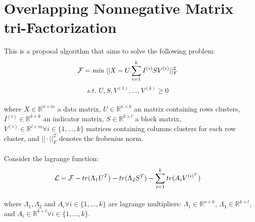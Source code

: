 \documentclass[paper=a4, fontsize=11pt]{scrartcl} %
\numberwithin{equation}{section} %
\numberwithin{figure}{section} %
\numberwithin{table}{section} %
\begin{document}

\section{Overlapping Nonnegative Matrix tri-Factorization}

This is a proposal algorithm that aims to solve the following problem:
$${\cal F} = \textit{min } ||X - U\sum_{i=1}^{k}I^{(i)}SV^{(i)}||^{2}_{F}$$
$$\textit{s.t. } U, S, V^{(1)}, \dots, V^{(k)} \geq 0$$
\paragraph{}
where $X \in \mathbb{R}^{n \times m}$ a data matrix, $U \in \mathbb{R}^{n \times k}$ an matrix containing rows clusters, $I^{(i)} \in \mathbb{R}^{k \times k}$ an indicator matrix, $S \in \mathbb{R}^{k \times l}$ a block matrix, $V^{(i)} \in \mathbb{R}^{l \times m} \forall i \in \{1, \dots, k\}$ matrices containing columns clusters for each row cluster, and $||\cdot||^2_{F}$ denotes the frobenius norm.

\paragraph{}
Consider the lagrange function:
$${\cal L} = {\cal F} - tr(\Lambda_1 U^T) - tr(\Lambda_2 S^T) - \sum_{i=1}^{k} tr(A_i V^{(i)^T})$$
\paragraph{}
where $\Lambda_1, \Lambda_2$ and $A_i \forall i \in \{1, \dots, k\}$ are lagrange multipliers: $\Lambda_1 \in \mathbb{R}^{n \times k}$, $\Lambda_1 \in \mathbb{R}^{k \times l}$, and $A_i \in \mathbb{R}^{k \times l} \forall i \in \{1, \dots, k\}$.
\end{document}
